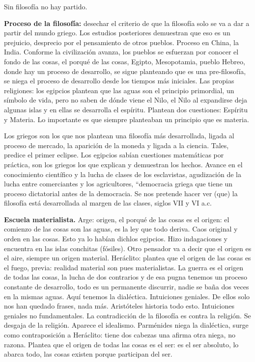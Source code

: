\documentclass[
  a4paper,
]{article}
\begin{document}
Sin filosofía no hay partido.

\textbf{Proceso de la filosofía:} desechar el criterio de que la
filosofía solo se va a dar a partir del mundo griego. Los estudios
posteriores demuestran que eso es un prejuicio, desprecio por el
pensamiento de otros pueblos. Proceso en China, la India. Conforme la
civilización avanza, los pueblos se esfuerzan por conocer el fondo de
las cosas, el porqué de las cosas, Egipto, Mesopotamia, pueblo Hebreo,
donde hay un proceso de desarrollo, se sigue planteando que es una
pre-filosofía, se niega el proceso de desarrollo desde los tiempos más
iniciales. Las propias religiones: los egipcios plantean que las aguas
son el principio primordial, un símbolo de vida, pero no saben de dónde
viene el Nilo, el Nilo al expandirse deja algunas islas y en ellas se
desarrolla el espíritu. Plantean dos cuestiones: Espíritu y Materia. Lo
importante es que siempre planteaban un principio que es materia.

Los griegos son los que nos plantean una filosofía más desarrollada,
ligada al proceso de mercado, la aparición de la moneda y ligada a la
ciencia. Tales, predice el primer eclipse. Los egipcios sabían
cuestiones matemáticas por práctica, son los griegos los que explican y
demuestran los hechos. Avance en el conocimiento científico y la lucha
de clases de los esclavistas, agudización de la lucha entre comerciantes
y los agricultores, ``democracia griega que tiene un proceso dictatorial
antes de la democracia. Se nos pretende hacer ver (que) la filosofía
está desarrollada al margen de las clases, siglos VII y VI a.c.

\textbf{Escuela materialista.} Arge: origen, el porqué de las cosas es
el origen: el comienzo de las cosas son las aguas, es la ley que todo
deriva. Caos original y orden en las cosas. Esto ya lo habían dichlos
egipcios. Hizo indagaciones y encuentra en las islas conchitas
(fósiles). Otro pensador va a decir que el origen es el aire, siempre un
origen material. Heráclito: plantea que el origen de las cosas es el
fuego, previa: realidad material son pues materialistas. La guerra es el
origen de todas las cosas, la lucha de dos contrarios y de esa pugna
tenemos un proceso constante de desarrollo, todo es un permanente
discurrir, nadie se baña dos veces en la mismas aguas. Aquí tenemos la
dialéctica. Intuiciones geniales. De ellos solo nos han quedado frases,
nada más. Aristóteles historia todo esto. Intuiciones geniales no
fundamentales. La contradicción de la filosofía es contra la religión.
Se desgaja de la religión. Aparece el idealismo. Parménides niega la
dialéctica, surge como contraposición a Heráclito: tiene dos cabezas una
afirma otra niega, no razona. Plantea que el origen de todas las cosas
es el ser: es el ser absoluto, lo abarca todo, las cosas existen porque
participan del ser.
\end{document}
